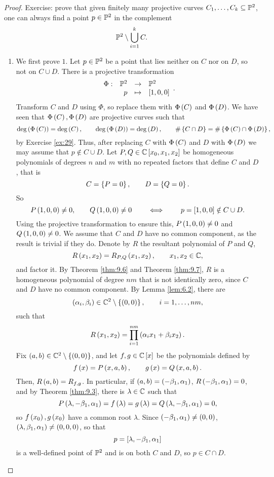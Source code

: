 \begin{proof}
Exercise: prove that given finitely many projective curves $ C_1, \dots, C_k \subseteq \P^2 $, one can always find a point $ p \in \P^2 $ in the complement
$$ \P^2 \setminus \bigcup_{i = 1}^k C. $$
\begin{enumerate}
\item We first prove $ 1 $. Let $ p \in \P^2 $ be a point that lies neither on $ C $ nor on $ D $, so not on $ C \cup D $. There is a projective transformation
$$ \function[\Phi]{\P^2}{\P^2}{p}{\sb{1, 0, 0}}. $$
Transform $ C $ and $ D $ using $ \Phi $, so replace them with $ \Phi\rb{C} $ and $ \Phi\rb{D} $. We have seen that $ \Phi\rb{C}, \Phi\rb{D} $ are projective curves such that
$$ \deg\rb{\Phi\rb{C}} = \deg\rb{C}, \qquad \deg\rb{\Phi\rb{D}} = \deg\rb{D}, \qquad \#\cb{C \cap D} = \#\cb{\Phi\rb{C} \cap \Phi\rb{D}}, $$
by Exercise \ref{ex:29}. Thus, after replacing $ C $ with $ \Phi\rb{C} $ and $ D $ with $ \Phi\rb{D} $ we may assume that $ p \notin C \cup D $. Let $ P, Q \in \C\sb{x_0, x_1, x_2} $ be homogeneous polynomials of degrees $ n $ and $ m $ with no repeated factors that define $ C $ and $ D $, that is
$$ C = \cb{P = 0}, \qquad D = \cb{Q = 0}. $$
So
$$ P\rb{1, 0, 0} \ne 0, \qquad Q\rb{1, 0, 0} \ne 0 \qquad \iff \qquad p = \sb{1, 0, 0} \notin C \cup D. $$
Using the projective transformation to ensure this, $ P\rb{1, 0, 0} \ne 0 $ and $ Q\rb{1, 0, 0} \ne 0 $. We assume that $ C $ and $ D $ have no common component, as the result is trivial if they do. Denote by $ R $ the resultant polynomial of $ P $ and $ Q $,
$$ R\rb{x_1, x_2} = R_{P, Q}\rb{x_1, x_2}, \qquad x_1, x_2 \in \C, $$
and factor it. By Theorem \ref{thm:9.6} and Theorem \ref{thm:9.7}, $ R $ is a homogeneous polynomial of degree $ nm $ that is not identically zero, since $ C $ and $ D $ have no common component. By Lemma \ref{lem:6.2}, there are
$$ \rb{\alpha_i, \beta_i} \in \C^2 \setminus \cb{\rb{0, 0}}, \qquad i = 1, \dots, nm, $$
such that
$$ R\rb{x_1, x_2} = \prod_{i = 1}^{nm} \rb{\alpha_ix_1 + \beta_ix_2}. $$
Fix $ \rb{a, b} \in \C^2 \setminus \cb{\rb{0, 0}} $, and let $ f, g \in \C\sb{x} $ be the polynomials defined by
$$ f\rb{x} = P\rb{x, a, b}, \qquad g\rb{x} = Q\rb{x, a, b}. $$
Then, $ R\rb{a, b} = R_{f, g} $. In particular, if $ \rb{a, b} = \rb{-\beta_1, \alpha_1} $, $ R\rb{-\beta_1, \alpha_1} = 0 $, and by Theorem \ref{thm:9.3}, there is $ \lambda \in \C $ such that
$$ P\rb{\lambda, -\beta_1, \alpha_1} = f\rb{\lambda} = g\rb{\lambda} = Q\rb{\lambda, -\beta_1, \alpha_1} = 0, $$
so $ f\rb{x_0}, g\rb{x_0} $ have a common root $ \lambda $. Since $ \rb{-\beta_1, \alpha_1} \ne \rb{0, 0} $, $ \rb{\lambda, \beta_1, \alpha_1} \ne \rb{0, 0, 0} $, so that
$$ p = \sb{\lambda, -\beta_1, \alpha_1} $$
is a well-defined point of $ \P^2 $ and is on both $ C $ and $ D $, so $ p \in C \cap D $.


\end{enumerate}
\end{proof}
